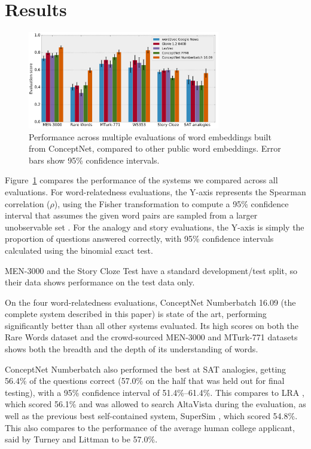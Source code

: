\documentclass[letterpaper]{article}
\begin{document}
\section{Results}
\begin{figure}
\centering
\includegraphics[width=3.3in]{eval-graph.png}
\caption{
    Performance across multiple evaluations of word embeddings built from
    ConceptNet, compared to other public word embeddings. Error bars
    show 95\% confidence intervals.
}
\label{eval-results}
\end{figure}

Figure~\ref{eval-results} compares the performance of the systems we compared
across all evaluations. For word-relatedness evaluations, the Y-axis represents
the Spearman correlation ($\rho$), using the Fisher transformation to compute a
95\% confidence interval that assumes the given word pairs are sampled from a
larger unobservable set \cite{bonett2000sample}. For the analogy and story evaluations,
the Y-axis is simply the proportion of questions answered correctly, with 95\%
confidence intervals calculated using the binomial exact test.

MEN-3000 and the Story Cloze Test have a standard development/test split, so
their data shows performance on the test data only.

On the four word-relatedness evaluations, ConceptNet Numberbatch 16.09 (the
complete system described in this paper) is state of the art, performing
significantly better than all other systems evaluated. Its high scores on both
the Rare Words dataset and the crowd-sourced MEN-3000 and MTurk-771 datasets
shows both the breadth and the depth of its understanding of words.

ConceptNet Numberbatch also performed the best at SAT analogies, getting 56.4\%
of the questions correct (57.0\% on the half that was held out for final
testing), with a 95\% confidence interval of 51.4\%--61.4\%.
This compares to LRA \cite{turney2005lra}, which scored 56.1\% and was
allowed to search AltaVista during the evaluation, as well as the previous best
self-contained system, SuperSim \cite{turney2013supersim}, which scored 54.8\%.
This also compares to the performance of the average human college applicant,
said by Turney and Littman to be 57.0\%.
\end{document}
